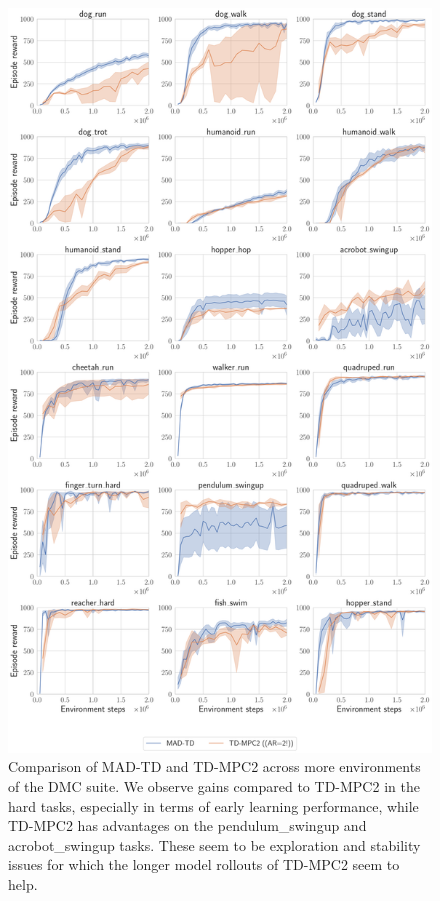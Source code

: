 \begin{figure}[H]
    \centering
    \includegraphics[width=.8\linewidth]{figures/mad-td/all_baseline_comp_rewards.pdf}
    \caption{Comparison of MAD-TD and TD-MPC2 across more environments of the DMC suite. We observe gains compared to TD-MPC2 in the hard tasks, especially in terms of early learning performance, while TD-MPC2 has advantages on the pendulum\_swingup and acrobot\_swingup tasks. These seem to be exploration and stability issues for which the longer model rollouts of TD-MPC2 seem to help.}
    \label{fig:all_baseline}
\end{figure}

